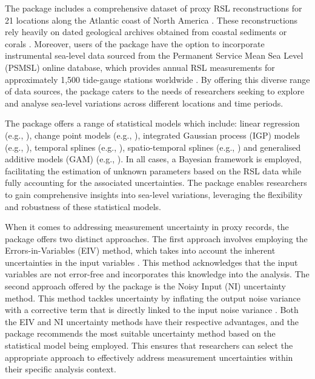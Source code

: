 The  package includes a comprehensive dataset of proxy RSL reconstructions for 21 locations along the Atlantic coast of North America \citep{Kemp2013SealevelUSA}. These reconstructions rely heavily on dated geological archives obtained from coastal sediments \citep[e.g.,][]{Gehrels1994} or corals \citep[e.g.,][]{Meltzner2017}. Moreover, users of the package have the option to incorporate instrumental sea-level data sourced from the Permanent Service Mean Sea Level (PSMSL) online database, which provides annual RSL measurements for approximately 1,500 tide-gauge stations worldwide \citep{Holgate_PSMSL2013}. By offering this diverse range of data sources, the  package caters to the needs of researchers seeking to explore and analyse sea-level variations across different locations and time periods.

The  package offers a range of statistical models which include: linear regression (e.g., \citet{Ashe2019}), change point models (e.g., \citet{Cahill2015_cp}), integrated Gaussian process (IGP) models (e.g., \citet{Cahill2015aStats}), temporal splines (e.g., \citet{deBoor1978}), spatio-temporal splines (e.g., \citet{simpson2018modelling}) and generalised additive models (GAM) (e.g., \citet{Upton2023noisy}). In all cases, a Bayesian framework is employed, facilitating the estimation of unknown parameters based on the RSL data while fully accounting for the associated uncertainties. The  package enables researchers to gain comprehensive insights into sea-level variations, leveraging the flexibility and robustness of these statistical models.

When it comes to addressing measurement uncertainty in proxy records, the  package offers two distinct approaches. The first approach involves employing the Errors-in-Variables (EIV) method, which takes into account the inherent uncertainties in the input variables \citep{Dey2000}. This method acknowledges that the input variables are not error-free and incorporates this knowledge into the analysis. The second approach offered by the package is the Noisy Input (NI) uncertainty method. This method tackles uncertainty by inflating the output noise variance with a corrective term that is directly linked to the input noise variance \citep{McHutchon2011}. Both the EIV and NI uncertainty methods have their respective advantages, and the  package recommends the most suitable uncertainty method based on the statistical model being employed. This ensures that researchers can select the appropriate approach to effectively address measurement uncertainties within their specific analysis context.

